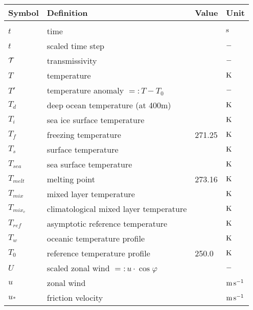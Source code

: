\newpage
\begin{tabular}{llll}
Symbol         & Definition                       & Value   & Unit \\
\hline \\


$t$       & time                             &         & $\rm s$ \\
$t$       & scaled time step                      &         & $\rm -$ \\
${\cal T}$     & transmissivity    &    &$\rm  -$ \\
$T$       & temperature                      &         & $\rm K$
\\
$T'$           & temperature anomaly $=:T-T_0$              &         & $\rm -$ \\
$T_d$          & deep ocean temperature (at 400m)      &         & $\rm K$
\\
$T_i$          & sea ice surface temperature           &         & $\rm K$ \\
$T_f$          & freezing temperature                  & 271.25  & $\rm K$
\\
$T_s$          & surface temperature                   &         & $\rm K$
\\
$T_{sea}$ & sea surface temperature     &    & $\rm K$ \\
$T_{melt}$     & melting point                    & 273.16  & $\rm K$ \\
$T_{mix}$      & mixed layer temperature               &         & $\rm K$ \\
$T_{mix_c}$    & climatological mixed layer temperature     &         & $\rm K$
\\
$T_{ref}$      & asymptotic reference temperature           &         & $\rm K$ \\
$T_w$          & oceanic temperature profile                &         &
$\rm K$ \\
$T_0$          & reference temperature profile         &  250.0  & $\rm K$
\\

$U$       & scaled zonal wind $=:u\cdot\cos\varphi$    &         & $\rm -$ \\
$u$       & zonal wind                       &         & $\rm m\, s^{-1}$
\\
$u_*$          & friction velocity                          &         & $\rm m\, s^{-1}$ \\


\end{tabular}
